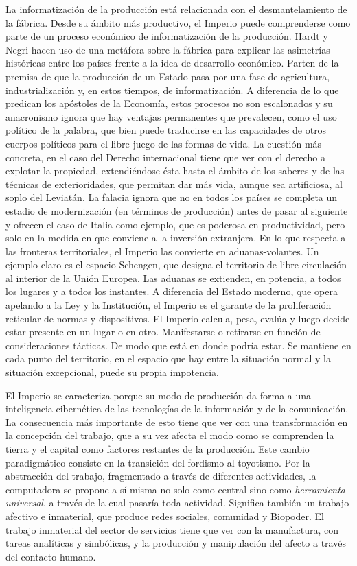 La informatización de la producción está relacionada con el desmantelamiento de la fábrica. Desde su ámbito más productivo, el Imperio puede comprenderse como parte de un proceso económico de informatización de la producción. Hardt y Negri hacen uso de una metáfora sobre la fábrica para explicar las asimetrías históricas entre los países frente a la idea de desarrollo económico. Parten de la premisa de que la producción de un Estado pasa por una fase de agricultura, industrialización y, en estos tiempos, de informatización. A diferencia de lo que predican los apóstoles de la Economía, estos procesos no son escalonados y su anacronismo ignora que hay ventajas permanentes que prevalecen, como el uso político de la palabra, que bien puede traducirse en las capacidades de otros cuerpos políticos para el libre juego de las formas de vida. La cuestión más concreta, en el caso del Derecho internacional tiene que ver con el derecho a explotar la propiedad, extendiéndose ésta hasta el ámbito de los saberes y de las técnicas de exterioridades, que permitan dar más vida, aunque sea artificiosa, al soplo del Leviatán. La falacia ignora que no en todos los países se completa un estadio de modernización (en términos de producción) antes de pasar al siguiente y ofrecen el caso de Italia como ejemplo, que es poderosa en productividad, pero solo en la medida en que conviene a la inversión extranjera. En lo que respecta a las fronteras territoriales, el Imperio las convierte en aduanas-volantes. Un ejemplo claro es el espacio Schengen, que designa el territorio de libre circulación al interior de la Unión Europea. Las aduanas se extienden, en potencia, a todos los lugares y a todos los instantes. A diferencia del Estado moderno, que opera apelando a la Ley y la Institución, el Imperio es el garante de la proliferación reticular de normas y dispositivos. El Imperio calcula, pesa, evalúa y luego decide estar presente en un lugar o en otro. Manifestarse o retirarse en función de consideraciones tácticas. De modo que está en donde podría estar. Se mantiene en cada punto del territorio, en el espacio que hay entre la situación normal y la situación excepcional, puede su propia impotencia.

El Imperio se caracteriza porque su modo de producción da forma a una inteligencia cibernética de las tecnologías de la información y de la comunicación. La consecuencia más importante de esto tiene que ver con una transformación en la concepción del trabajo, que a su vez afecta el modo como se comprenden la tierra y el capital como factores restantes de la producción. Este cambio paradigmático consiste en la transición del fordismo al toyotismo. Por la abstracción del trabajo, fragmentado a través de diferentes actividades, la computadora se propone a sí misma no solo como central sino como \emph{herramienta universal}, a través de la cual pasaría toda actividad. Significa también un trabajo afectivo e inmaterial, que produce redes sociales, comunidad y Biopoder. El trabajo inmaterial del sector de servicios tiene que ver con la manufactura, con tareas analíticas y simbólicas, y la producción y manipulación del afecto a través del contacto humano.

